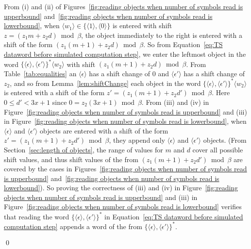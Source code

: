 \documentclass[11pt]{article} \usepackage{amsfonts,amsmath,amssymb,amsthm}
\renewenvironment{proof}{{\bfseries\noindent Proof.}}{\qed\vspace{3.5ex}}
\newcommand{\tne}[1]{\ensuremath{\langle #1\rangle}}
\newcommand{\encodeDeletion}{\tne{\epsilon}}
\newcommand{\encodeDeletionPrime}{\tne{\epsilon'}}
\begin{document}
\begin{proof}
From (i) and (ii) of Figures~\ref{fig:reading objects when number of symbols read is upperbound} and~\ref{fig:reading objects when number of symbols read is lowerbound}, when $\tne{w_1}\in\{\tne{1},\tne{0}\}$ is entered with shift $z=(z_1m+z_2d)\bmod\beta$, the object immediately to the right is entered with a shift of the form $(z_1(m+1)+z_2d)\bmod\beta$. 
So from Equation~\eqref{eq:TS dataword before simulated computation step}, we enter the leftmost object in the word $\{\encodeDeletion,\encodeDeletionPrime\}^\ast\tne{w_2}$ with shift $(z_1(m+1)+z_2d)\bmod\beta$. From Table~\ref{tab:equalities} an $\encodeDeletion$ has a shift change of 0 and $\encodeDeletionPrime$ has a shift change of $z_2$, and so from Lemma~\ref{lem:shiftChange} each object in the word $\{\encodeDeletion,\encodeDeletionPrime\}^\ast\tne{w_2}$ is entered with a shift of the form $z'=(z_1(m+1)+z_2d')\bmod\beta$. Here $0\leqslant d'<3x+1$ since $0=z_2(3x+1)\bmod\beta$. 
From (iii) and (iv) in Figure~\ref{fig:reading objects when number of symbols read is upperbound} and (iii) in Figure~\ref{fig:reading objects when number of symbols read is lowerbound}, when $\encodeDeletion$ and $\encodeDeletionPrime$ objects are entered with a shift of the form $z'=(z_1(m+1)+z_2d')\bmod\beta$, they append only $\encodeDeletion$ and $\encodeDeletionPrime$ objects. 
(From Section~\ref{sec:length of objects}, the range of values for $m$ and $d$ cover all possible shift values, and thus shift values of the from $(z_1(m+1)+z_2d')\bmod\beta$ are covered by the cases in Figures~\ref{fig:reading objects when number of symbols read is upperbound} and~\ref{fig:reading objects when number of symbols read is lowerbound}). 
So proving the correctness of (iii) and (iv) in Figure~\ref{fig:reading objects when number of symbols read is upperbound} and (iii) in Figure~\ref{fig:reading objects when number of symbols read is lowerbound} verifies that reading the word $\{\encodeDeletion,\encodeDeletionPrime\}^\ast$ in Equation~\eqref{eq:TS dataword before simulated computation step} appends a word of the from $\{\encodeDeletion,\encodeDeletionPrime\}^\ast$. 


\end{proof}
\end{document}
